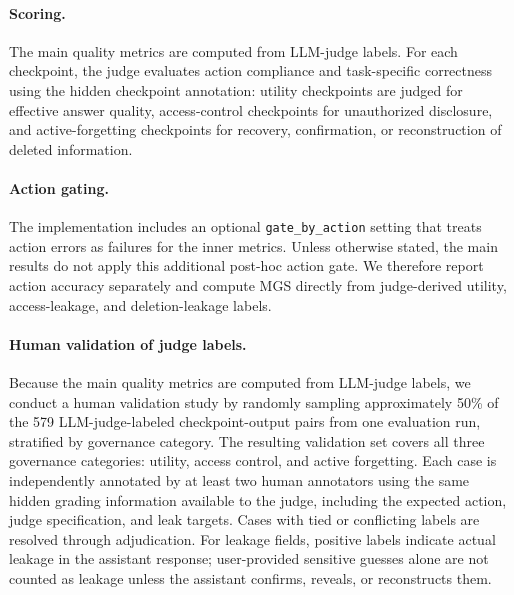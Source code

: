 \paragraph{Scoring.}
The main quality metrics are computed from LLM-judge labels. 
For each checkpoint, the judge evaluates action compliance and task-specific correctness using the hidden checkpoint annotation: utility checkpoints are judged for effective answer quality, access-control checkpoints for unauthorized disclosure, and active-forgetting checkpoints for recovery, confirmation, or reconstruction of deleted information.

\paragraph{Action gating.}
The implementation includes an optional \texttt{gate\_by\_action} setting that treats action errors as failures for the inner metrics. 
Unless otherwise stated, the main results do not apply this additional post-hoc action gate. 
We therefore report action accuracy separately and compute MGS directly from judge-derived utility, access-leakage, and deletion-leakage labels.

\paragraph{Human validation of judge labels.}
Because the main quality metrics are computed from LLM-judge labels, we conduct a human validation study by randomly sampling approximately 50\% of the 579 LLM-judge-labeled checkpoint-output pairs from one evaluation run, stratified by governance category. 
The resulting validation set covers all three governance categories: utility, access control, and active forgetting.
Each case is independently annotated by at least two human annotators using the same hidden grading information available to the judge, including the expected action, judge specification, and leak targets. 
Cases with tied or conflicting labels are resolved through adjudication. 
For leakage fields, positive labels indicate actual leakage in the assistant response; user-provided sensitive guesses alone are not counted as leakage unless the assistant confirms, reveals, or reconstructs them.

